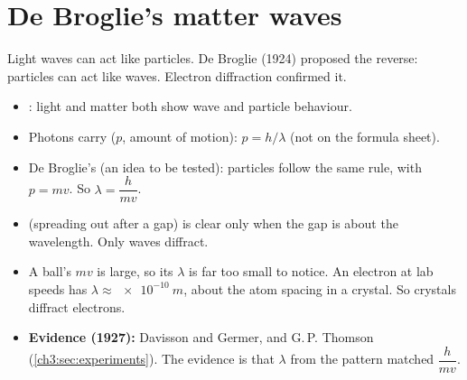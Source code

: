 \section{De Broglie's matter waves}\label{ch3:sec:debroglie}

\begin{bigidea}
Light waves can act like particles. De Broglie (1924) proposed the reverse: particles can act
like waves. Electron diffraction confirmed it.
\end{bigidea}

\begin{itemize}
  \item {}: light and matter both show wave and particle behaviour.
  \item Photons carry  ($p$, amount of motion): $p = h/\lambda$ (not on the
        formula sheet).
  \item De Broglie's  (an idea to be tested): particles follow the same rule,
        with $p = mv$. So $\lambda = \dfrac{h}{mv}$.
  \item {} (spreading out after a gap) is clear only when the gap is about the
        wavelength. Only waves diffract.
  \item A ball's $mv$ is large, so its $\lambda$ is far too small to notice. An electron at
        lab speeds has $\lambda \approx \qty{e-10}{m}$, about the atom spacing in a crystal. So
        crystals diffract electrons.
  \item \textbf{Evidence (1927):} Davisson and Germer, and G.\,P. Thomson
        (\cref{ch3:sec:experiments}). The evidence is that $\lambda$ from the pattern matched
        $\dfrac{h}{mv}$.
\end{itemize}

